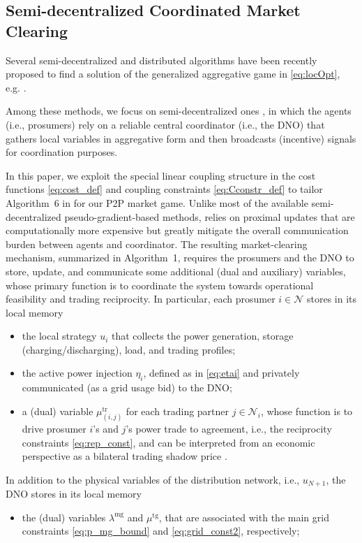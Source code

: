 \documentclass{IEEEtran}  %
\newcommand{\mc}{\mathcal}
\newcommand{\0}{\mathbf{0}}
\newcommand{\1}{\mathbf{1}}
\begin{document}
\subsection{Semi-decentralized Coordinated Market Clearing}
Several semi-decentralized and distributed algorithms have been recently proposed to find a solution of the generalized aggregative game in \eqref{eq:locOpt}, e.g. \cite{paccagnan2019,belgioioso2020semi,belgioioso2020b,
gadjov2020single,bianchi2020fast}. 
%
{%
Among these methods, we focus on semi-decentralized ones \cite{belgioioso2020semi}, in which the agents (i.e., prosumers) rely on a reliable central coordinator (i.e., the DNO) that gathers local variables in aggregative form and then broadcasts (incentive) signals for coordination purposes. 

%
In this paper, we exploit the special linear coupling structure in the cost functions \eqref{eq:cost_def} and coupling constraints \eqref{eq:Cconstr_def} to tailor Algorithm~6 in \cite{belgioioso2020semi} for our P2P market game.
%
Unlike most of the available semi-decentralized pseudo-gradient-based methods, \cite[Algorithm~6]{belgioioso2020semi} relies on proximal updates that are computationally more expensive but greatly mitigate the overall communication burden between agents and coordinator.
%
The resulting market-clearing mechanism, summarized in Algorithm~1, requires the prosumers and the DNO to store, update, and communicate some additional (dual and auxiliary) variables, whose primary function is to coordinate the system towards operational feasibility and trading reciprocity. In particular, each prosumer $i\in\mc N$ stores in its local memory
\begin{itemize}
\item the local strategy $u_i$ that collects the power generation, storage (charging/discharging), load, and trading profiles;

\item the active power injection $\eta_i$, defined as in \eqref{eq:etai} and privately communicated (as a grid usage bid) to the DNO;

\item a (dual) variable $\mu^{\text{tr}}_{(i,j)}$ for each trading partner $j \in \mc N_i$, whose function is to drive prosumer $i$'s and $j$'s power trade to agreement, i.e., the reciprocity constraints \eqref{eq:rep_const}, and can be interpreted from an economic perspective as a bilateral trading shadow price \cite[Section 2.4]{lecadre2020}.

\end{itemize}
In addition to the physical variables of the distribution network, i.e., $u_{N\!+\!1}$, the DNO stores in its local memory
\begin{itemize}
\item the (dual) variables $\lambda^{\text{mg}}$ and $\mu^{\text{tg}} $, that are associated with the main grid constraints \eqref{eq:p_mg_bound} and \eqref{eq:grid_const2}, respectively;


\end{itemize}}
\end{document}
